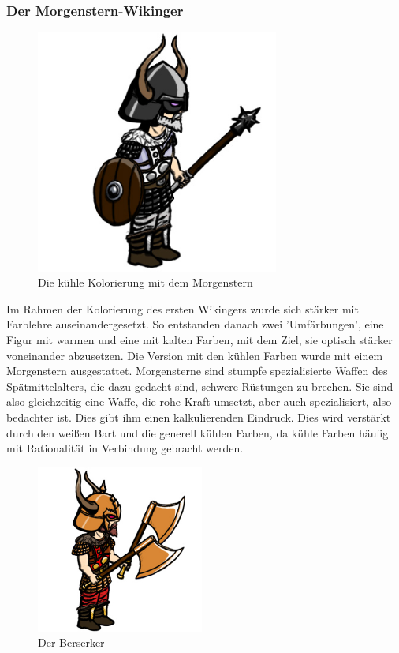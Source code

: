 \documentclass[extern,palatino]{cgBA}
\begin{document}
\newpage
\subsubsection{Der Morgenstern-Wikinger}
\begin{figure}[H]
	\centering
	\includegraphics[height=8cm]{morningstar.jpg}
	\caption{Die kühle Kolorierung mit dem Morgenstern}
	\label{morningstar}
\end{figure}
Im Rahmen der Kolorierung des ersten Wikingers wurde sich stärker mit Farblehre auseinandergesetzt. So entstanden danach zwei 'Umfärbungen', eine Figur mit warmen und eine mit kalten Farben, mit dem Ziel, sie optisch stärker voneinander abzusetzen. Die Version mit den kühlen Farben wurde mit einem Morgenstern ausgestattet. Morgensterne sind stumpfe spezialisierte Waffen des Spätmittelalters, die dazu gedacht sind, schwere Rüstungen zu brechen\cite{morg}. Sie sind also gleichzeitig eine Waffe, die rohe Kraft umsetzt, aber auch spezialisiert, also bedachter ist. Dies gibt ihm einen kalkulierenden Eindruck. Dies wird verstärkt durch den weißen Bart und die generell kühlen Farben, da kühle Farben häufig mit Rationalität in Verbindung gebracht werden\cite{color1}.
\newpage
\begin{figure}[H]
	\centering
	\includegraphics[height=5.5cm]{berserker.jpg}
	\caption{Der Berserker}
	\label{berserker} 
\end{figure}
\end{document}
